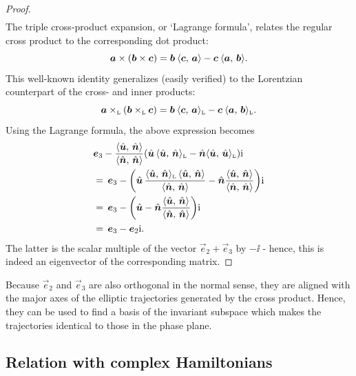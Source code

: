 \begin{proof}
\begin{equation*}
\begin{split}
        \end{split}
    \end{equation*}
The triple cross-product expansion, or `Lagrange formula', relates the regular cross product to the corresponding dot product:
    $$ \vec{a}\times\qty(\vec{b}\times\vec{c}) = \vec{b}\:\inner{\vec{c}}{\vec{a}} - \vec{c}\:\inner{\vec{a}}{\vec{b}}. $$
This well-known identity generalizes (easily verified) to the Lorentzian counterpart of the cross- and inner products:
    $$ 
        \lorcrossp{\vec{a}}{\qty(\lorcrossp{\vec{b}}{\vec{c}})} 
       = \vec{b}\:\lorinner{\vec{c}}{\vec{a}} - \vec{c}\:\lorinner{\vec{a}}{\vec{b}}. 
    $$
Using the Lagrange formula, the above expression becomes
    \begin{equation*}
        \begin{split}
            & \vec{e}_3 - \frac{ \inner{\uvec{u}}{\uvec{n}} }{ \inner{\uvec{n}}{\uvec{n}} }\qty(\uvec{u}\,\lorinner{\uvec{u}}{\uvec{n}} - \uvec{n}\lorinner{\uvec{u}}{\uvec{u}})\ii \\
            & =\, \vec{e}_3 - \qty(\uvec{u}\,\frac{ \lorinner{\uvec{u}}{\uvec{n}} \, \inner{\uvec{u}}{\uvec{n}} }{ \inner{\uvec{n}}{\uvec{n}} } - \uvec{n}\frac{ \inner{\uvec{u}}{\uvec{n}} }{ \inner{\uvec{n}}{\uvec{n}} })\ii \\
            & =\, \vec{e}_3 - \qty(\uvec{u} - \uvec{n}\frac{ \inner{\uvec{u}}{\uvec{n}} }{ \inner{\uvec{n}}{\uvec{n}} })\ii \\
            & =\, \vec{e}_3 - \vec{e}_2\ii. 
        \end{split}
    \end{equation*}
    The latter is the scalar multiple of the vector $\vec{e}_2 + \vec{e}_3$ by $-\ii$ - hence, this is indeed an eigenvector of the corresponding matrix.
\end{proof}
Because $\vec{e}_2$ and $\vec{e}_3$ are also orthogonal in the normal sense, they are aligned with the major axes of the elliptic trajectories generated by the cross product. Hence, they can be used to find a basis of the invariant subspace which makes the trajectories identical to those in the phase plane.

\subsection{Relation with complex Hamiltonians}
\label{ssec:complex_ham}
